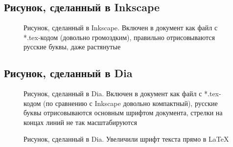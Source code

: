 \subsection{Рисунок, сделанный в Inkscape}

\begin{figure}[H] \centering

\caption{Рисунок, сделанный в Inkscape. Включен в документ как файл с *.tex-кодом (довольно громоздким), правильно отрисовываются русские буквы, даже растянутые}
\label{ris:image1_ink}
\end{figure}


\subsection{Рисунок, сделанный в Dia}

\begin{figure}[H] \centering

\caption{Рисунок, сделанный в Dia. Включен в документ как файл с *.tex-кодом (по сравнению с Inkscape довольно компактный), русские буквы отрисовываются основным шрифтом документа, стрелки на концах линий не так масштабируются}
\label{ris:image1_dia}
\end{figure}



\begin{figure}[H] \centering {}

\caption{Рисунок, сделанный в Dia. Увеличили шрифт текста прямо в LaTeX}
\label{ris:image1_dia}
\end{figure}








